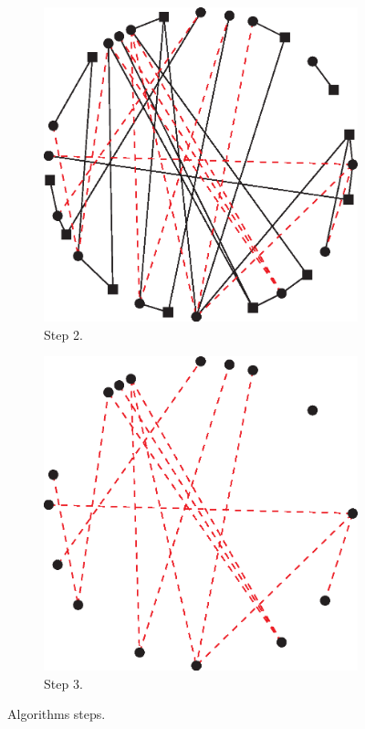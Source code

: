 \begin{figure}[h]
\begin{subfigure}[b]{0.3\textwidth}
          \includegraphics[width=\textwidth]{chapters/03_implementation/cs_motif_2}
          \caption{Step 2.}
          \label{fig:motifs_alg_2}
        \end{subfigure}
        \quad
        \begin{subfigure}[b]{0.3\textwidth}
          \includegraphics[width=\textwidth]{chapters/03_implementation/cs_motif_3}
          \caption{Step 3.}
          \label{fig:motifs_alg_3}
        \end{subfigure}
        \caption{Algorithms steps.}
        \label{fig:motifs_alg}
      \end{figure}
